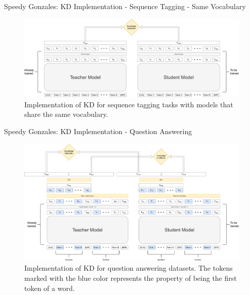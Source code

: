 \documentclass[aspectratio=169,xcolor=dvipsnames]{beamer}
\begin{document}
\begin{frame}{Speedy Gonzales: KD Implementation - Sequence Tagging - Same Vocabulary}

\begin{figure}
    \centering
    \includegraphics[width=\columnwidth]{images/KD-sequence-tagging-same-vocabulary.pdf}
    \caption{Implementation of KD for sequence tagging tasks with models that share the same vocabulary.}
    \label{fig:KD-sequence-tagging-same-vocabulary}
\end{figure}

\end{frame}
\begin{frame}{Speedy Gonzales: KD Implementation - Question Answering}

\begin{figure}
    \centering
    \includegraphics[width=0.69\columnwidth]{images/KD-QA.pdf}
    \caption{Implementation of KD for question answering datasets. The tokens marked with the blue color represents the property of being the first token of a word.}
    \label{fig:KD-QA}
\end{figure}


\end{frame}
\end{document}
